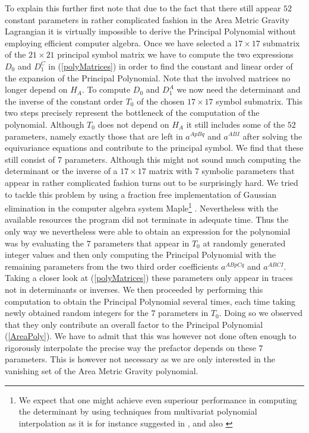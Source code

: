 \documentclass[a4paper,12pt, DIV=14, BCOR=5mm, twoside, headsepline, numbers=noenddot]{scrbook}
\begin{document}
To explain this further first note that due to the fact that there still appear $52$ constant parameters in rather complicated fashion in the Area Metric Gravity Lagrangian it is virtually impossible to derive the Principal Polynomial without employing efficient computer algebra. Once we have selected a $17 \times 17$ submatrix of the $21 \times 21$ principal symbol matrix we have to compute the two expressions $D_0$ and $D_{1}^C$ in (\ref{polyMatrices}) in order to find the constant and linear order of the expansion of the Principal Polynomial. Note that the involved matrices no longer depend on $H_A$. To compute $D_0$ and $D_1^A$ we now need the determinant and the inverse of the constant order $T_0$ of the chosen $17 \times 17$ symbol submatrix. This two steps precisely represent the bottleneck of the computation of the polynomial. Although $T_0$ does not depend on $H_A$ it still includes some of the $52$ parameters, namely exactly those that are left in $a^{ApBq}$ and $a^{ABI}$ after solving the equivariance equations and contribute to the principal symbol. We find that these still consist of $7$ parameters. Although this might not sound much computing the determinant or the inverse of a $17 \times 17$ matrix with $7$ symbolic parameters that appear in rather complicated fashion turns out to be surprisingly hard. We tried to tackle this problem by using a fraction free implementation of Gaussian elimination in the computer algebra system Maple\footnote{We expect that one might achieve even superiour performance in computing the determinant by using techniques from multivariat polynomial interpolation as it is for instance suggested in \cite{Qin2018}, \cite{MARCO2004749} and also \cite{articleDet}} \cite{Maple}. Nevertheless with the available resources the program did not terminate in adequate time. Thus the only way we nevertheless were able to obtain an expression for the polynomial was by evaluating the $7$ parameters that appear in $T_0$ at randomly generated integer values and then only computing the Principal Polynomial with the remaining parameters from the two third order coefficients $a^{ABpCq}$ and $a^{ABCI}$. Taking a closer look at (\ref{polyMatrices}) these parameters only appear in traces not in determinants or inverses. We then proceeded by performing this computation to obtain the Principal Polynomial several times, each time taking newly obtained random integers for the $7$ parameters in $T_0$. Doing so we observed that they only contribute an overall factor to the Principal Polynomial (\ref{AreaPoly}). We have to admit that this was however not done often enough to rigorously interpolate the precise way the prefactor depends on these $7$ parameters. This is however not necessary as we are only interested in the vanishing set of the Area Metric Gravity polynomial. \\
\end{document}
